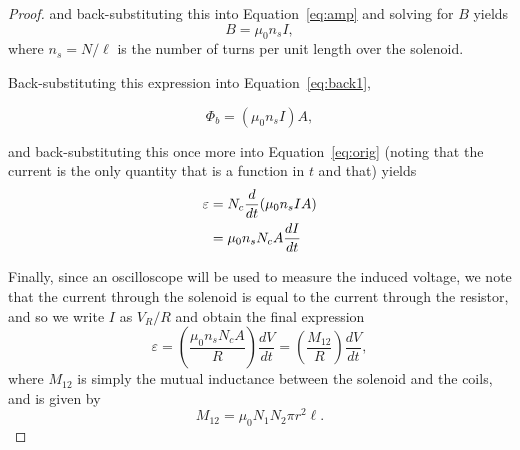 \documentclass[twocolumn,english]{IEEEtran}
\theoremstyle{plain}
\theoremstyle{plain}
\begin{document}
\begin{proof}
and back-substituting this into Equation~\ref{eq:amp} and solving for $B$ yields
\begin{equation}
	B = \mu_0 n_s I,
\end{equation}
where $n_s = N/\ell$ is the number of turns per unit length over the solenoid.

Back-substituting this expression into Equation~\ref{eq:back1},

\begin{equation}
	\Phi_b = (\mu_0 n_s I)A,
\end{equation}

and back-substituting this once more into Equation~\ref{eq:orig} (noting that the current is the only quantity that is a function in $t$ and that) yields
\begin{align}
	\varepsilon &= N_c \frac{d}{dt}(\mu_0 n_s IA) \notag \\
	&= \mu_0 n_s N_c A \frac{dI}{dt}
\end{align}

Finally, since an oscilloscope will be used to measure the induced voltage, we note that the current through the solenoid is equal to the current through the resistor, and so we write $I$ as $V_R/R$ and obtain the final expression
\begin{equation}\label{eq:final}
	\varepsilon = \left(\frac{\mu_0 n_s N_c A}{R}\right) \frac{dV}{dt} = \left( \frac{M_{12}}{R} \right) \frac{dV}{dt},
\end{equation}
where $M_{12}$ is simply the mutual inductance between the solenoid and the coils, and is given by
\begin{equation}
	M_{12} = \mu_0 N_1 N_2 \pi r^2 \ell.
\end{equation}

\end{proof}
\end{document}
